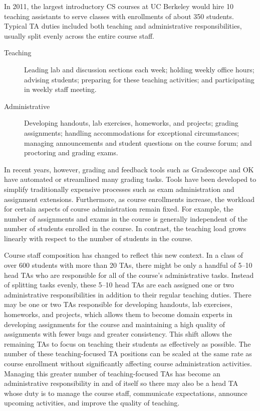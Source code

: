 In 2011, the largest introductory CS courses at UC Berkeley would hire 10 teaching assistants to serve classes with enrollments of about 350 students. Typical TA duties included both teaching and administrative responsibilities, usually split evenly across the entire course staff.
\begin{description}
\item[Teaching] Leading lab and discussion sections each week; holding weekly office hours; advising students; preparing for these teaching activities; and participating in weekly staff meeting.
\item[Administrative] Developing handouts, lab exercises, homeworks, and projects; grading assignments; handling accommodations for exceptional circumstances; managing announcements and student questions on the course forum; and proctoring and grading exams.
\end{description}

In recent years, however, grading and feedback tools such as Gradescope and OK have automated or streamlined many grading tasks. Tools have been developed to simplify traditionally expensive processes such as exam administration and assignment extensions. Furthermore, as course enrollments increase, the workload for certain aspects of course administration remain fixed. For example, the number of assignments and exams in the course is generally independent of the number of students enrolled in the course. In contrast, the teaching load grows linearly with respect to the number of students in the course.

Course staff composition has changed to reflect this new context. In a class of over 600 students with more than 20 TAs, there might be only a handful of 5--10 head TAs who are responsible for all of the course's administrative tasks. Instead of splitting tasks evenly, these 5--10 head TAs are each assigned one or two administrative responsibilities in addition to their regular teaching duties. There may be one or two TAs responsible for developing handouts, lab exercises, homeworks, and projects, which allows them to become domain experts in developing assignments for the course and maintaining a high quality of assignments with fewer bugs and greater consistency. This shift allows the remaining TAs to focus on teaching their students as effectively as possible. The number of these teaching-focused TA positions can be scaled at the same rate as course enrollment without significantly affecting course administration activities. Managing this greater number of teaching-focused TAs has become an administrative responsibility in and of itself so there may also be a head TA whose duty is to manage the course staff, communicate expectations, announce upcoming activities, and improve the quality of teaching.

